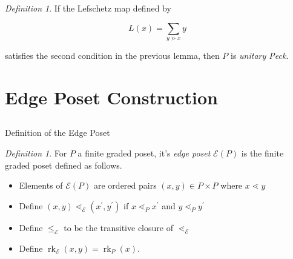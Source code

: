 \documentclass{beamer}
\theoremstyle{remark}
\newtheorem{defn}[thm]{Definition}
\newcommand\rk{\operatorname{rk}}
\begin{document}
\begin{frame}
\begin{defn}
If the Lefschetz map defined by

$$L(x) = \sum_{y\gtrdot x} y$$

satisfies the second condition in the previous lemma, then $P$ is \textit{unitary Peck}.
\end{defn}
\end{frame}








\section{Edge Poset Construction}
\subsection{}

\begin{frame}{Definition of the Edge Poset}
\begin{defn}
\label{defn:functor_of_edges}
For $P$ a finite graded poset, it's \textit{edge poset} $\mathcal{E}(P)$ is the finite graded poset defined as follows. 
\begin{itemize}

\item Elements of $\mathcal{E}(P)$ are ordered pairs $(x,y)\in P\times P$ where $x\lessdot y$

\item Define $(x,y) \lessdot_{\mathcal{E}} (x^\prime,y^\prime)$ if $x\lessdot_P x^\prime$ and $y\lessdot_P y^\prime$

\item Define $\le_{\mathcal{E}}$ to be the transitive closure of $\lessdot_{\mathcal{E}}$

\item Define $\rk_{\mathcal{E}}(x,y) = \rk_P(x)$.
\end{itemize}
\end{defn}
\end{frame}
\end{document}
